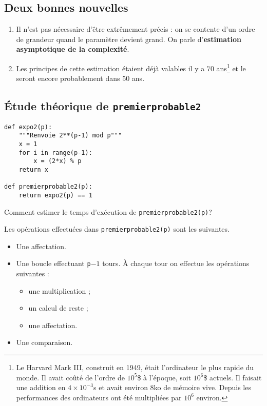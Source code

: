 \subsection{Deux bonnes nouvelles}

\begin{enumerate}
\item Il n'est pas nécessaire d'être extrêmement précis : on se  contente d'un ordre de grandeur quand le paramètre devient grand. On
  parle d'\textbf{estimation asymptotique de la complexité}.
\item Les principes de cette estimation étaient déjà
  valables il y a $70$ ans\footnote{Le Harvard Mark III, construit en
    1949, était  l'ordinateur le plus rapide du
    monde. Il avait coûté de l'ordre de $10^{5}$\$ à l'époque, soit
    $10^{6}$\$ actuels. Il faisait une addition en $4\times 10^{-3}$s
    et avait environ $8$ko de mémoire vive. Depuis les performances
    des ordinateurs ont été multipliées par $10^{6}$ environ.} et le
  seront encore probablement dans $50$ ans.
\end{enumerate}

\subsection{Étude théorique de \lstinline{premierprobable2}}

\begin{lstlisting}
def expo2(p):
    """Renvoie 2**(p-1) mod p"""
    x = 1
    for i in range(p-1):
        x = (2*x) % p
    return x  
    
def premierprobable2(p):
    return expo2(p) == 1
\end{lstlisting}

Comment estimer le temps d'exécution de \lstinline{premierprobable2(p)}?

Les opérations effectuées dans \lstinline{premierprobable2(p)} sont les suivantes.
\begin{itemize}
\item Une affectation.
\item Une boucle effectuant \lstinline{p}$-1$ tours. À chaque tour on
  effectue les opérations suivantes :
  \begin{itemize}
  \item une multiplication ;
  \item un calcul de reste ;
  \item une affectation.
  \end{itemize}
\item Une comparaison.
\end{itemize}

